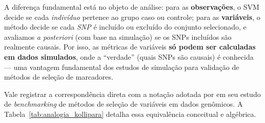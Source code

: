 \documentclass[
    12pt,
    a4paper,
    oneside,
    english,
    french,
    spanish,
    brazil
    ]{abntex2}
\newcommand{\novo}[1]{\textcolor{corNova}{#1}}
\begin{document}
\novo{A diferença fundamental está no objeto de análise: para as \textbf{observações}, o SVM decide se cada \emph{indivíduo} pertence ao grupo caso ou controle; para as \textbf{variáveis}, o método decide se cada \emph{SNP} é incluído ou excluído do conjunto selecionado, e avaliamos \textit{a posteriori} (com base na simulação) se os SNPs incluídos são realmente causais. Por isso, as métricas de variáveis \textbf{só podem ser calculadas em dados simulados}, onde a ``verdade'' (quais SNPs são causais) é conhecida --- uma vantagem fundamental dos estudos de simulação para validação de métodos de seleção de marcadores.}

\novo{Vale registrar a correspondência direta com a notação adotada por \citeonline{Kollipara2026} em seu estudo de \textit{benchmarking} de métodos de seleção de variáveis em dados genômicos. A Tabela~\ref{tab:analogia_kollipara} detalha essa equivalência conceitual e algébrica.}
\end{document}
